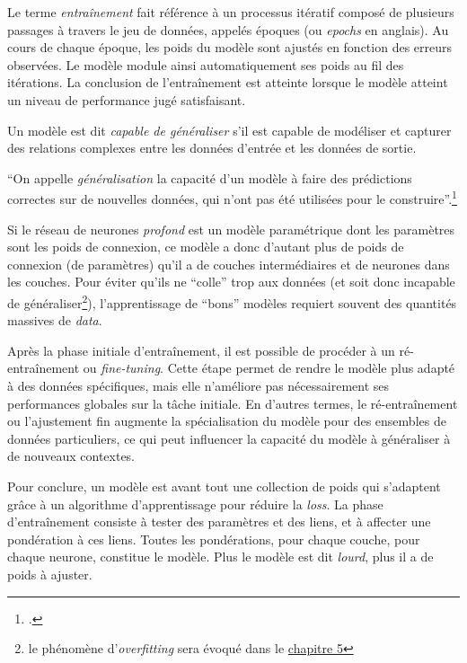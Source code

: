 Le terme \emph{entraînement} fait référence à un processus itératif
composé de plusieurs passages à travers le jeu de données, appelés
époques (ou \emph{epochs} en anglais). Au cours de chaque époque, les
poids du modèle sont ajustés en fonction des erreurs observées. Le
modèle module ainsi automatiquement ses poids au fil des itérations. La
conclusion de l'entraînement est atteinte lorsque le modèle atteint un
niveau de performance jugé satisfaisant.

Un modèle est dit \textit{capable de généraliser} s'il est capable de
modéliser et capturer des relations complexes entre les données d'entrée
et les données de sortie.

\begin{kwote}                     
``On appelle \emph{généralisation} la capacité d'un modèle à faire des
prédictions correctes sur de nouvelles données, qui n'ont pas été
utilisées pour le construire''.\footcite[p.27]{azencott_introduction_2022}
                 \end{kwote}     

Si le réseau de neurones \textit{profond} est un modèle paramétrique dont les
paramètres sont les poids de connexion, ce modèle a donc d'autant plus
de poids de connexion (de paramètres) qu'il a de couches intermédiaires
et de neurones dans les couches. Pour éviter qu'ils ne ``colle'' trop
aux données (et soit donc incapable de généraliser\footnote{le phénomène
  d'\emph{overfitting} sera évoqué dans le \hyperlink{fine-tuner-le-modele}{chapitre 5}}),
l'apprentissage de ``bons'' modèles requiert souvent des quantités
massives de \textit{data}.

Après la phase initiale d'entraînement, il est possible de procéder à un
ré-entraînement ou \emph{fine-tuning}. Cette étape permet de rendre le
modèle plus adapté à des données spécifiques, mais elle n'améliore pas
nécessairement ses performances globales sur la tâche initiale. En
d'autres termes, le ré-entraînement ou l'ajustement fin augmente la
spécialisation du modèle pour des ensembles de données particuliers, ce
qui peut influencer la capacité du modèle à généraliser à de nouveaux
contextes.

Pour conclure, un modèle est avant tout une collection de poids qui
s'adaptent grâce à un algorithme d'apprentissage pour réduire la \textit{loss}.
La phase d'entraînement consiste à tester des paramètres et des liens,
et à affecter une pondération à ces liens. Toutes les pondérations,
pour chaque couche, pour chaque neurone, constitue le modèle. Plus le modèle est dit \textit{lourd}, plus il a de
poids à ajuster.